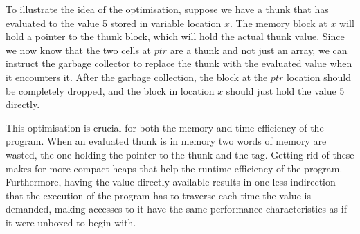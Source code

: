 To illustrate the idea of the optimisation, suppose we have a thunk that has
evaluated to the value 5 stored in variable location $x$. The memory block at
$x$ will hold a pointer to the thunk block, which will hold the actual thunk
value. Since we now know that the two cells at $ptr$ are a thunk and not just an
array, we can instruct the garbage collector to replace the thunk with the
evaluated value when it encounters it. After the garbage collection, the block
at the $ptr$ location should be completely dropped, and the block in location
$x$ should just hold the value 5 directly.

This optimisation is crucial for both the memory and time efficiency of the
program. When an evaluated thunk is in memory two words of memory are wasted,
the one holding the pointer to the thunk and the  tag. Getting
rid of these makes for more compact heaps that help the runtime efficiency of
the program. Furthermore, having the value directly available results in one
less indirection that the execution of the program has to traverse each time the
value is demanded, making accesses to it have the same performance
characteristics as if it were unboxed to begin with.

